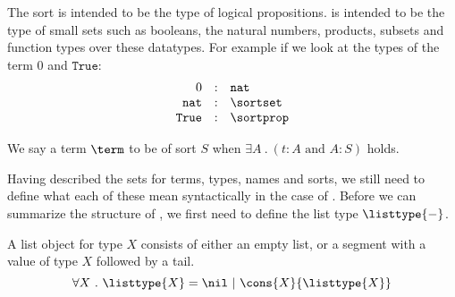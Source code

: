 The sort \sortprop is intended to be the type of logical propositions.
\sortset is intended to be the type of small sets such as booleans, the natural numbers, products, subsets and function types over these datatypes.
For example if we look at the types of the term $0$ and $\texttt{True}$:
	\[
		\begin{array}{rcl}
			0 & : & \texttt{nat} \\
			\texttt{nat} & : & \sortset \\
			\texttt{True} & : & \sortprop
		\end{array}
	\]

We say a term $\term$ to be of sort $S$ when $\exists A ~.~ (t : A \text{~and~} A : S)$ holds.


Having described the sets for terms, types, names and sorts,
we still need to define what each of these mean syntactically in the case of \pcic.
Before we can summarize the structure of \pcic, we first need to define the list type $\listtype{-}$.

\begin{definition}[\listtype{-}]
	A list object for type $X$ consists of either an empty list, or a segment with a value of type $X$ followed by a tail.
	  \[ \forall X ~.~ \listtype{X} = \nil ~|~ \cons{X}{\listtype{X}} \]
  \end{definition}

